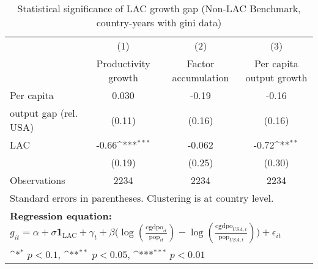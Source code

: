 \begin{table}[htbp]\centering
\def\sym#1{\ifmmode^{#1}\else\(^{#1}\)\fi}
\caption{Statistical significance of LAC growth gap (Non-LAC Benchmark, country-years with gini data)}
\begin{tabular}{l*{3}{c}}
\toprule
                &\multicolumn{1}{c}{(1)}&\multicolumn{1}{c}{(2)}&\multicolumn{1}{c}{(3)}\\
                &\multicolumn{1}{c}{Productivity growth}&\multicolumn{1}{c}{Factor accumulation}&\multicolumn{1}{c}{Per capita output growth}\\
\midrule
Per capita      &    0.030         &    -0.19         &    -0.16         \\
output gap (rel. USA)&   (0.11)         &   (0.16)         &   (0.16)         \\
\addlinespace
LAC             &    -0.66\sym{***}&   -0.062         &    -0.72\sym{**} \\
                &   (0.19)         &   (0.25)         &   (0.30)         \\
\midrule
Observations    &     2234         &     2234         &     2234         \\
\bottomrule
\multicolumn{4}{l}{\footnotesize Standard errors in parentheses. Clustering is at country level.}\\
\multicolumn{4}{l}{\footnotesize \textbf{Regression equation:} \(g_{it} = \alpha + \sigma \mathbf{1}_{\textrm{LAC}} + \gamma_t + \beta \big(\log (\frac{\textrm{cgdpo}_{it}}{\textrm{pop}_{it}} ) - \log (\frac{\textrm{cgdpo}_{USA,t}}{\textrm{pop}_{USA,t}}  ) \big) + \epsilon_{it}\)}\\
\multicolumn{4}{l}{\footnotesize \sym{*} \(p<0.1\), \sym{**} \(p<0.05\), \sym{***} \(p<0.01\)}\\
\end{tabular}
\end{table}
